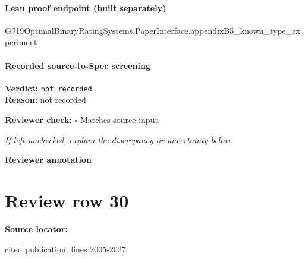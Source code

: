 \documentclass[10pt]{article}
\newcommand{\reviewerbox}{%
  \par\noindent\fbox{\parbox{0.96\linewidth}{\rule{0pt}{0.38in}}}\par
}
\newcommand{\reviewmatch}[1]{%
  \par\noindent\textbf{Reviewer check:} $\square$\; #1\par
  \noindent\emph{If left unchecked, explain the discrepancy or uncertainty below.}\par
}
\begin{document}
\paragraph{Lean proof endpoint (built separately)}\begin{ReviewVerbatim}
GJ19OptimalBinaryRatingSystems.PaperInterface.appendixB5_known_type_experiment
\end{ReviewVerbatim}

\paragraph{Recorded source-to-Spec screening}
\textbf{Verdict:} \texttt{not recorded}
\\
\textbf{Reason:} not recorded
\reviewmatch{Matches source input}
\noindent\textbf{Reviewer annotation}\par
\reviewerbox
\clearpage
\hypertarget{source-claim-b26a46506065f742}{}
\section*{Review row 30}
\textbf{Source locator:} {\footnotesize\raggedright cited publication, lines 2005-\allowbreak{}2027\par}
\end{document}
